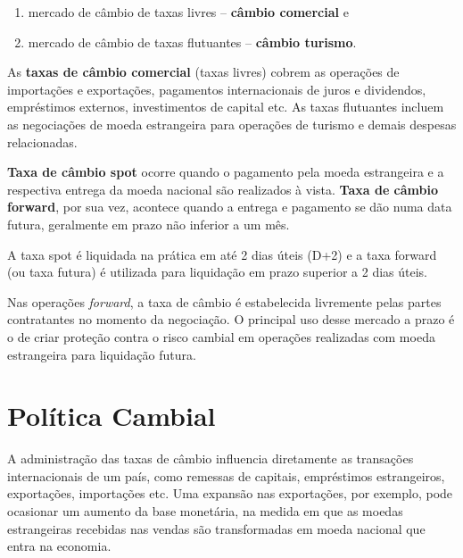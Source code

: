 \documentclass{article}\usepackage[]{graphicx}\usepackage[]{xcolor}
\begin{document}
\begin{enumerate}

  \item mercado de câmbio de taxas livres – \textbf{câmbio comercial} e
  
  \item mercado de câmbio de taxas flutuantes – \textbf{câmbio turismo}.
  
\end{enumerate}

As \textbf{taxas de câmbio comercial} (taxas livres) cobrem as operações de importações e exportações, 
pagamentos internacionais de juros e dividendos, empréstimos externos, investimentos de capital etc. 
As taxas flutuantes incluem as negociações de moeda estrangeira para operações de turismo e 
demais despesas relacionadas.\par

\textbf{Taxa de câmbio spot} ocorre quando o pagamento pela moeda estrangeira e a respectiva entrega da 
moeda nacional são realizados à vista. \textbf{Taxa de câmbio forward}, por sua vez, acontece quando a 
entrega e pagamento se dão numa data futura, geralmente em prazo não inferior a um mês.\par

A taxa spot é liquidada na prática em até 2 dias úteis (D+2)  e a taxa forward (ou taxa futura) 
é utilizada para liquidação em prazo superior a 2 dias úteis.\par

Nas operações \textit{forward}, a taxa de câmbio é estabelecida livremente pelas partes contratantes no 
momento da negociação. O principal uso desse mercado a prazo é o de criar proteção contra o risco 
cambial em operações realizadas com moeda estrangeira para liquidação futura.\par

\section*{Política Cambial}

A administração das taxas de câmbio influencia diretamente as transações internacionais de um país, 
como remessas de capitais, empréstimos estrangeiros, exportações, importações etc. Uma expansão nas 
exportações, por exemplo, pode ocasionar um aumento da base monetária, na medida em que as moedas 
estrangeiras recebidas nas vendas são transformadas em moeda nacional que entra na economia.\par
\end{document}
